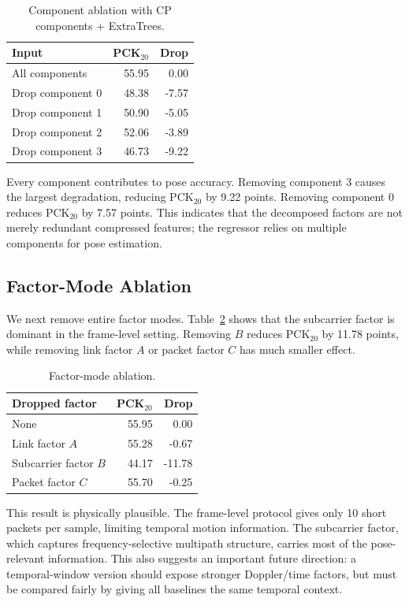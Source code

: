 \documentclass[letterpaper]{article}
\begin{document}
\begin{table}[t]
\centering
\caption{Component ablation with CP components + ExtraTrees.}
\label{tab:component_ablation}
\begin{tabular}{lrr}
\toprule
Input & PCK$_{20}$ & Drop \\
\midrule
All components & 55.95 & 0.00 \\
Drop component 0 & 48.38 & -7.57 \\
Drop component 1 & 50.90 & -5.05 \\
Drop component 2 & 52.06 & -3.89 \\
Drop component 3 & 46.73 & -9.22 \\
\bottomrule
\end{tabular}
\end{table}

Every component contributes to pose accuracy. Removing component 3 causes the largest degradation, reducing PCK$_{20}$ by 9.22 points. Removing component 0 reduces PCK$_{20}$ by 7.57 points. This indicates that the decomposed factors are not merely redundant compressed features; the regressor relies on multiple components for pose estimation.

\subsection{Factor-Mode Ablation}

We next remove entire factor modes. Table~\ref{tab:mode_ablation} shows that the subcarrier factor is dominant in the frame-level setting. Removing $B$ reduces PCK$_{20}$ by 11.78 points, while removing link factor $A$ or packet factor $C$ has much smaller effect.

\begin{table}[t]
\centering
\caption{Factor-mode ablation.}
\label{tab:mode_ablation}
\begin{tabular}{lrr}
\toprule
Dropped factor & PCK$_{20}$ & Drop \\
\midrule
None & 55.95 & 0.00 \\
Link factor $A$ & 55.28 & -0.67 \\
Subcarrier factor $B$ & 44.17 & -11.78 \\
Packet factor $C$ & 55.70 & -0.25 \\
\bottomrule
\end{tabular}
\end{table}

This result is physically plausible. The frame-level protocol gives only 10 short packets per sample, limiting temporal motion information. The subcarrier factor, which captures frequency-selective multipath structure, carries most of the pose-relevant information. This also suggests an important future direction: a temporal-window version should expose stronger Doppler/time factors, but must be compared fairly by giving all baselines the same temporal context.
\end{document}
